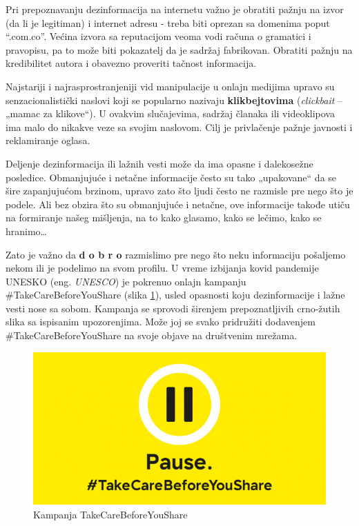 \documentclass[a4paper]{article}
\begin{document}
Pri prepoznavanju dezinformacija na internetu važno je obratiti pažnju na izvor (da li je legitiman) i internet adresu - treba biti oprezan sa domenima poput “.com.co”. Većina izvora sa reputacijom veoma vodi računa o gramatici i pravopisu, pa to može biti pokazatelj da je sadržaj fabrikovan. Obratiti pažnju na kredibilitet autora i obavezno proveriti tačnost informacija.


Najstariji i najrasprostranjeniji vid manipulacije u onlajn medijima upravo su 
senzacionalistički naslovi koji se popularno nazivaju \textbf{klikbejtovima} \cite{clickbait} (\emph{clickbait} – „mamac za klikove“). U ovakvim slučajevima, sadržaj članaka ili videoklipova ima malo do nikakve veze sa svojim naslovom. Cilj je privlačenje pažnje javnosti i reklamiranje oglasa. 


Deljenje dezinformacija ili lažnih vesti može da ima opasne i dalekosežne 
posledice. Obmanjujuće i netačne informacije često su tako „upakovane“ da se šire zapanjujućom brzinom, upravo zato što ljudi često ne razmisle pre nego što je podele. \newline
Ali bez obzira što su obmanjujuće i netačne, ove informacije takođe utiču na 
formiranje našeg mišljenja, na to kako glasamo, kako se lečimo, kako se hranimo… 



Zato je važno da \textbf{d o b r o} razmislimo pre nego što neku informaciju 
pošaljemo nekom ili je podelimo na svom profilu. 
U vreme izbijanja kovid pandemije UNESKO (eng. \emph{UNESCO}) je pokrenuo onlajn kampanju \newline
\#TakeCareBeforeYouShare \cite{unesco kampanja} (slika \ref{fig:takecarebeforeyoushare}), usled opasnosti koju dezinformacije i lažne vesti nose sa sobom. Kampanja se sprovodi širenjem prepoznatljivih crno-žutih slika sa ispisanim upozorenjima. Može joj se svako pridružiti dodavenjem \#TakeCareBeforeYouShare na svoje objave na društvenim mrežama.

\begin{figure}[ht!]
\begin{center}
\includegraphics[scale=0.4]{takecarebeforeyoushare.jpg}
\end{center}
\caption{Kampanja TakeCareBeforeYouShare}
\label{fig:takecarebeforeyoushare}
\end{figure}
\end{document}
